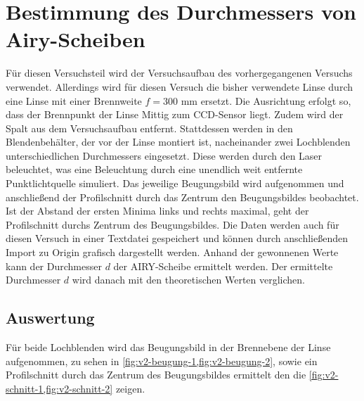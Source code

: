 \documentclass[../protokoll.tex]{subfiles}
\begin{document}
\section{Bestimmung des Durchmessers von Airy-Scheiben}
Für diesen Versuchsteil wird der Versuchsaufbau des vorhergegangenen Versuchs verwendet. Allerdings wird für diesen Versuch die bisher verwendete Linse durch eine Linse mit einer Brennweite $f = 300$ mm ersetzt. Die Ausrichtung erfolgt so, dass der Brennpunkt der Linse Mittig zum CCD-Sensor liegt. Zudem wird der Spalt aus dem Versuchsaufbau entfernt. Stattdessen werden in den Blendenbehälter, der vor der Linse montiert ist, nacheinander zwei Lochblenden unterschiedlichen Durchmessers eingesetzt. Diese werden durch den Laser beleuchtet, was eine Beleuchtung durch eine unendlich weit entfernte Punktlichtquelle simuliert. Das jeweilige Beugungsbild wird aufgenommen und anschließend der Profilschnitt durch das Zentrum den Beugungsbildes beobachtet. Ist der Abstand der ersten Minima links und rechts maximal, geht der Profilschnitt durchs Zentrum des Beugungsbildes. Die Daten werden auch für diesen Versuch in einer Textdatei gespeichert und können durch anschließenden Import zu Origin grafisch dargestellt werden. Anhand der gewonnenen Werte kann der Durchmesser $d$ der AIRY-Scheibe ermittelt werden. Der ermittelte Durchmesser $d$ wird danach mit den theoretischen Werten verglichen.

\subsection{Auswertung}
Für beide Lochblenden wird das Beugungsbild in der Brennebene der Linse aufgenommen, zu sehen in \cref{fig:v2-beugung-1,fig:v2-beugung-2}, sowie ein Profilschnitt durch das Zentrum des Beugungsbildes ermittelt den die \cref{fig:v2-schnitt-1,fig:v2-schnitt-2} zeigen.
\end{document}
